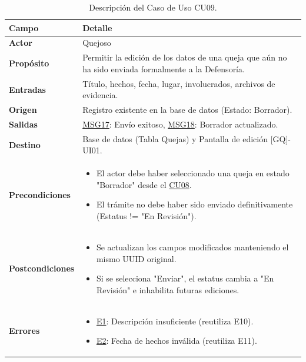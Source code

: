 \begin{appendices}
\begin{table}[htbp]
\centering
\small
\begin{tabular}{|p{3.5cm}|p{10.5cm}|}
\hline
\rowcolor[HTML]{EFEFEF} 
\textbf{Campo} & \textbf{Detalle} \\ \hline
\textbf{Actor} & Quejoso \\ \hline
\textbf{Propósito} & Permitir la edición de los datos de una queja que aún no ha sido enviada formalmente a la Defensoría. \\ \hline
\textbf{Entradas} & Título, hechos, fecha, lugar, involucrados, archivos de evidencia. \\ \hline
\textbf{Origen} & Registro existente en la base de datos (Estado: Borrador). \\ \hline
\textbf{Salidas} & \hyperlink{msg:MSG17}{MSG17}: Envío exitoso, \hyperlink{msg:MSG18}{MSG18}: Borrador actualizado. \\ \hline
\textbf{Destino} & Base de datos (Tabla Quejas) y Pantalla de edición [GQ]-UI01. \\ \hline
\textbf{Precondiciones} & 
\begin{itemize}[nosep, leftmargin=*]
    \item El actor debe haber seleccionado una queja en estado "Borrador" desde el \hyperlink{anexo:casos_uso}{CU08}.
    \item El trámite no debe haber sido enviado definitivamente (Estatus != "En Revisión").
\end{itemize} \\ \hline
\textbf{Postcondiciones} & 
\begin{itemize}[nosep, leftmargin=*]
    \item Se actualizan los campos modificados manteniendo el mismo UUID original.
    \item Si se selecciona "Enviar", el estatus cambia a "En Revisión" e inhabilita futuras ediciones.
\end{itemize} \\ \hline
\textbf{Errores} & 
\begin{itemize}[nosep, leftmargin=*]
    \item \hyperlink{err:E10}{E1}: Descripción insuficiente (reutiliza E10).
    \item \hyperlink{err:E11}{E2}: Fecha de hechos inválida (reutiliza E11).
\end{itemize} \\ \hline
\end{tabular}
\caption{Descripción del Caso de Uso CU09.}
\label{tab:cu09_especificacion}
\end{table}


\end{appendices}
